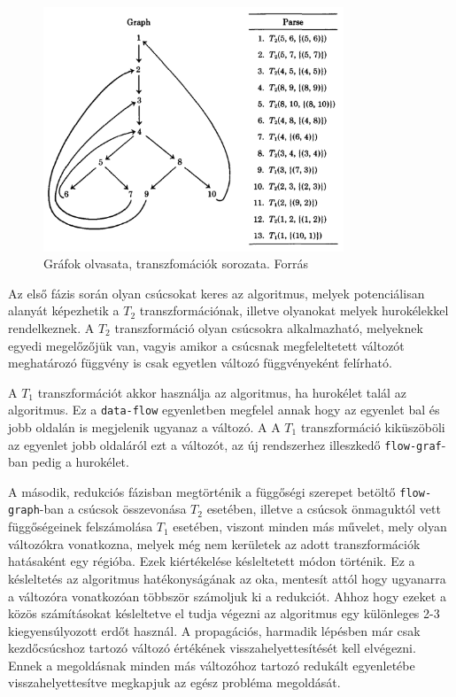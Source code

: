 \documentclass[12pt,a4paper]{article}
\begin{document}
\begin{figure}[h]
\caption{Gráfok olvasata, transzfomációk sorozata. Forrás \cite{article}}
\centering
\includegraphics[width=0.8\textwidth]{parse.png}
\end{figure}

Az első fázis során olyan csúcsokat keres az algoritmus, melyek potenciálisan alanyát képezhetik a $T_2$ transzformációnak, illetve olyanokat melyek hurokélekkel rendelkeznek. A $T_2$ transzformáció olyan csúcsokra alkalmazható, melyeknek egyedi megelőzőjük van, vagyis amikor a csúcsnak megfeleltetett változót meghatározó függvény is csak egyetlen változó függvényeként felírható.

A $T_1$ transzformációt akkor használja az algoritmus, ha hurokélet talál az algoritmus. Ez a \texttt{data-flow} egyenletben megfelel annak hogy az egyenlet bal és jobb oldalán is megjelenik ugyanaz a változó. A A $T_1$ transzformáció kiküszöböli az egyenlet jobb oldaláról ezt a változót, az új rendszerhez illeszkedő \texttt{flow-graf}-ban pedig a hurokélet.

A második, redukciós fázisban megtörténik a függőségi szerepet betöltő \texttt{flow-graph}-ban a csúcsok összevonása $T_2$ esetében, illetve a csúcsok önmaguktól vett függőségeinek felszámolása $T_1$ esetében, viszont minden más művelet, mely olyan változókra vonatkozna, melyek még nem kerületek az adott transzformációk hatásaként egy régióba. Ezek kiértékelése késleltetett módon történik. Ez a késleltetés az algoritmus hatékonyságának az oka, mentesít attól hogy ugyanarra a változóra vonatkozóan többször számoljuk ki a redukciót.
Ahhoz hogy ezeket a közös számításokat késleltetve el tudja végezni az algoritmus egy különleges 2-3 kiegyensúlyozott erdőt használ.
A propagációs, harmadik lépésben már csak kezdőcsúcshoz tartozó változó értékének visszahelyettesítését kell elvégezni. Ennek a megoldásnak minden más változóhoz tartozó redukált egyenletébe visszahelyettesítve megkapjuk az egész probléma megoldását.
\end{document}
